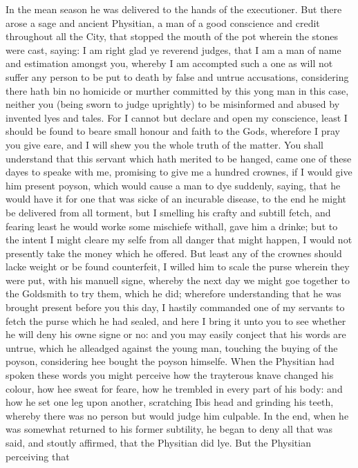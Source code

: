 In the mean season he was delivered to the hands of the executioner. But there
arose a sage and ancient Physitian, a man of a good conscience and credit
throughout all the City, that stopped the mouth of the pot wherein the stones
were cast, saying: I am right glad ye reverend judges, that I am a man of name
and estimation amongst you, whereby I am accompted such a one as will not
suffer any person to be put to death by false and untrue accusations,
considering there hath bin no homicide or murther committed by this yong man in
this case, neither you (being sworn to judge uprightly) to be misinformed and
abused by invented lyes and tales. For I cannot but declare and open my
conscience, least I should be found to beare small honour and faith to the
Gods, wherefore I pray you give eare, and I will shew you the whole truth of
the matter. You shall understand that this servant which hath merited to be
hanged, came one of these dayes to speake with me, promising to give me a
hundred crownes, if I would give him present poyson, which would cause a man to
dye suddenly, saying, that he would have it for one that was sicke of an
incurable disease, to the end he might be delivered from all torment, but I
smelling his crafty and subtill fetch, and fearing least he would worke some
mischiefe withall, gave him a drinke; but to the intent I might cleare my selfe
from all danger that might happen, I would not presently take the money which
he offered. But least any of the crownes should lacke weight or be found
counterfeit, I willed him to scale the purse wherein they were put, with his
manuell signe, whereby the next day we might goe together to the Goldsmith to
try them, which he did; wherefore understanding that he was brought present
before you this day, I hastily commanded one of my servants to fetch the purse
which he had sealed, and here I bring it unto you to see whether he will deny
his owne signe or no: and you may easily conject that his words are untrue,
which he alleadged against the young man, touching the buying of the poyson,
considering hee bought the poyson himselfe. When the Physitian had spoken these
words you might perceive how the trayterous knave changed his colour, how hee
sweat for feare, how he trembled in every part of his body: and how he set one
leg upon another, scratching Ibis head and grinding his teeth, whereby there
was no person but would judge him culpable. In the end, when he was somewhat
returned to his former subtility, he began to deny all that was said, and
stoutly affirmed, that the Physitian did lye. But the Physitian perceiving that
